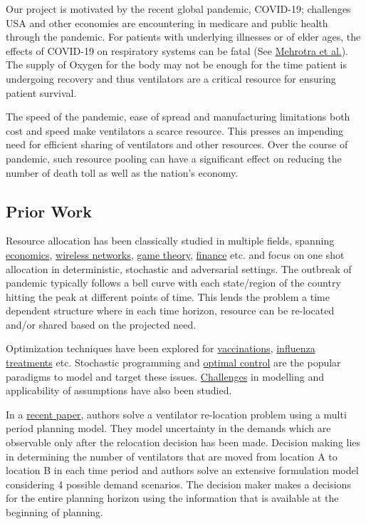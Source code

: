 \documentclass[11pt,letterpaper]{article}
\begin{document}
Our project is motivated by the recent global pandemic, COVID-19; challenges USA and other economies are encountering in medicare and public health through the pandemic. For patients with underlying illnesses or of elder ages, the effects of COVID-19 on respiratory systems can be fatal (See \href{http://www.optimization-online.org/DB_FILE/2020/04/7719.pdf}{Mehrotra et al.}). The supply of Oxygen for the body may not be enough for the time patient is undergoing recovery and thus ventilators are a critical resource for ensuring patient survival. 

The speed of the pandemic, ease of spread and manufacturing limitations both cost and speed make ventilators a scarce resource. This presses an impending need for efficient sharing of ventilators and other resources. Over the course of pandemic, such resource pooling can have a significant effect on reducing the number of death toll as well as the nation's economy.  

\subsection*{Prior Work}
Resource allocation has been classically studied in multiple fields, spanning
\href{https://eprints.illc.uva.nl/168/}{economics},
\href{https://dl.acm.org/doi/book/10.5555/1457343}{wireless networks},
\href{https://link.springer.com/chapter/10.1007/978-1-349-24002-9_5}{game theory},
\href{https://ideas.repec.org/a/eee/jrpoli/v22y1996i3p218-220.html}{finance} etc. 
and focus on one shot allocation in deterministic, stochastic and adversarial settings. 
The outbreak of pandemic typically follows a bell curve with each state/region of the country hitting the peak at different points of time. 
This lends the problem a time dependent structure where in each time horizon, resource can be re-located and/or shared based on the projected need. 

Optimization techniques have been explored for 
\href{https://www.ncbi.nlm.nih.gov/pubmed/18700149}{vaccinations},
\href{http://www2.pitt.edu/~schaefer/papers/FluShotDesign.pdf}{influenza treatments} etc. Stochastic programming and \href{https://www.sciencedirect.com/science/article/abs/pii/0025556479900828}{optimal control} are the popular paradigms to model and target these issues. \href{https://www.sciencedirect.com/science/article/pii/S1755436514000280}{Challenges} in modelling and applicability of assumptions have also been studied. 

In a \href{https://pubsonline.informs.org/doi/pdf/10.1287/trsc.2017.0777}{recent paper}, authors solve a ventilator re-location problem using a multi period planning model. They model uncertainty in the demands which are observable only after the relocation decision has been made. Decision making lies in determining the number of ventilators that are moved from location A to location B in each time period and authors solve an extensive formulation model considering 4 possible demand scenarios. The decision maker makes a decisions for the entire planning horizon using the information that is available at the beginning of planning. 
\end{document}
